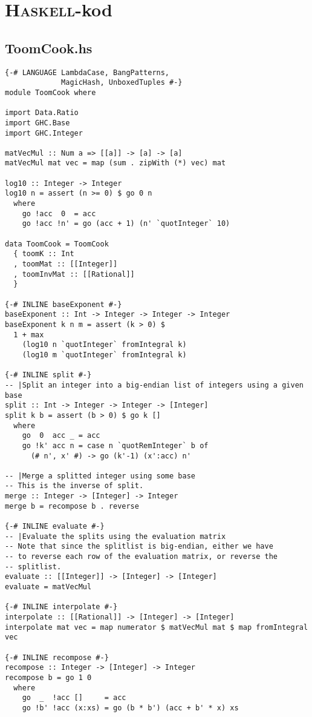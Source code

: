 \section{\textsc{Haskell}-kod}
\subsection{ToomCook.hs}
\label{sec:haskell}
\begin{verbatim}
{-# LANGUAGE LambdaCase, BangPatterns,
             MagicHash, UnboxedTuples #-}
module ToomCook where

import Data.Ratio
import GHC.Base
import GHC.Integer

matVecMul :: Num a => [[a]] -> [a] -> [a]
matVecMul mat vec = map (sum . zipWith (*) vec) mat

log10 :: Integer -> Integer
log10 n = assert (n >= 0) $ go 0 n
  where
    go !acc  0  = acc
    go !acc !n' = go (acc + 1) (n' `quotInteger` 10)

data ToomCook = ToomCook
  { toomK :: Int
  , toomMat :: [[Integer]]
  , toomInvMat :: [[Rational]]
  }

{-# INLINE baseExponent #-}
baseExponent :: Int -> Integer -> Integer -> Integer
baseExponent k n m = assert (k > 0) $
  1 + max
    (log10 n `quotInteger` fromIntegral k)
    (log10 m `quotInteger` fromIntegral k)

{-# INLINE split #-}
-- |Split an integer into a big-endian list of integers using a given base
split :: Int -> Integer -> Integer -> [Integer]
split k b = assert (b > 0) $ go k []
  where
    go  0  acc _ = acc
    go !k' acc n = case n `quotRemInteger` b of
      (# n', x' #) -> go (k'-1) (x':acc) n'

-- |Merge a splitted integer using some base
-- This is the inverse of split.
merge :: Integer -> [Integer] -> Integer
merge b = recompose b . reverse

{-# INLINE evaluate #-}
-- |Evaluate the splits using the evaluation matrix
-- Note that since the splitlist is big-endian, either we have
-- to reverse each row of the evaluation matrix, or reverse the
-- splitlist.
evaluate :: [[Integer]] -> [Integer] -> [Integer]
evaluate = matVecMul

{-# INLINE interpolate #-}
interpolate :: [[Rational]] -> [Integer] -> [Integer]
interpolate mat vec = map numerator $ matVecMul mat $ map fromIntegral vec

{-# INLINE recompose #-}
recompose :: Integer -> [Integer] -> Integer
recompose b = go 1 0
  where
    go  _  !acc []     = acc
    go !b' !acc (x:xs) = go (b * b') (acc + b' * x) xs


\end{verbatim}
